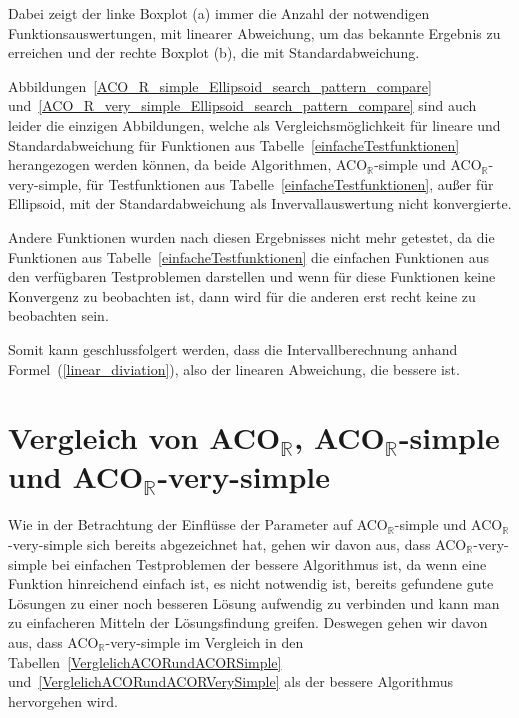 \documentclass[fontsize=12, a4aper]{scrartcl}
\begin{document}
	Dabei zeigt der linke Boxplot (a) immer die Anzahl der notwendigen Funktionsauswertungen, mit linearer Abweichung, um das bekannte Ergebnis zu erreichen und der rechte Boxplot (b), die mit Standardabweichung.\hfill\newline
	
	Abbildungen~\ref{ACO_R_simple_Ellipsoid_search_pattern_compare} und~\ref{ACO_R_very_simple_Ellipsoid_search_pattern_compare} sind auch leider die einzigen Abbildungen, welche als Vergleichsmöglichkeit für lineare und Standardabweichung für Funktionen aus Tabelle~\ref{einfacheTestfunktionen} herangezogen werden können, da beide Algorithmen, ACO\(_{\mathbb{R}}\)-simple und ACO\(_{\mathbb{R}}\)-very-simple, für Testfunktionen aus Tabelle~\ref{einfacheTestfunktionen}, außer für \glqq Ellipsoid\grqq, mit der Standardabweichung als Invervallauswertung nicht konvergierte.\hfill\newline
	
	Andere Funktionen wurden nach diesen Ergebnisses nicht mehr getestet, da die Funktionen aus Tabelle~\ref{einfacheTestfunktionen} die einfachen Funktionen aus den verfügbaren Testproblemen darstellen und wenn für diese Funktionen keine Konvergenz zu beobachten ist, dann wird für die anderen erst recht keine zu beobachten sein.\hfill\newline
	
	Somit kann geschlussfolgert werden, dass die Intervallberechnung anhand Formel~(\ref{linear_diviation}), also der linearen Abweichung, die bessere ist.

	\section{Vergleich von ACO\(_{\mathbb{R}}\), ACO\(_{\mathbb{R}}\)-simple und ACO\(_{\mathbb{R}}\)-very-simple} \label{VergleichACORundACORSimpleundACORVerySimple}
	
	Wie in der Betrachtung der Einflüsse der Parameter auf ACO\(_{\mathbb{R}}\)-simple und ACO\(_{\mathbb{R}}\)-very-simple sich bereits abgezeichnet hat, gehen wir davon aus, dass ACO\(_{\mathbb{R}}\)-very-simple bei einfachen Testproblemen der bessere Algorithmus ist, da wenn eine Funktion hinreichend einfach ist, es nicht notwendig ist, bereits gefundene gute Lösungen zu einer noch besseren Lösung aufwendig zu verbinden und kann man zu einfacheren Mitteln der Lösungsfindung greifen. Deswegen gehen wir davon aus, dass ACO\(_{\mathbb{R}}\)-very-simple im Vergleich in den Tabellen~\ref{VerglelichACORundACORSimple} und~\ref{VerglelichACORundACORVerySimple} als der bessere Algorithmus hervorgehen wird.\hfill\newline
	
\end{document}
